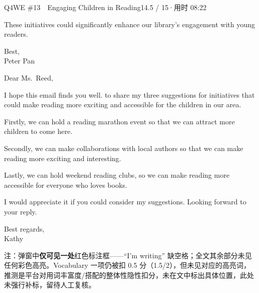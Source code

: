 \begin{qblock}{Q4\quad WE \#13\ \ Engaging Children in Reading}{14.5 / 15\quad·\quad 用时 08:22}
\begin{modelbox}
These initiatives could significantly enhance our library's engagement with young readers.

Best,\\ Peter Pan
\end{modelbox}

\begin{youbox}
Dear Ms.\ Reed,

I hope this email finds you well.  to share my three suggestions for initiatives that could make reading more exciting and accessible for the children in our area.

Firstly, we can hold a reading marathon event so that we can attract more children to come here.

Secondly, we can make collaborations with local authors so that we can make reading more exciting and interesting.

Lastly, we can hold weekend reading clubs, so we can make reading more accessible for everyone who loves books.

I would appreciate it if you could consider my suggestions. Looking forward to your reply.

Best regards,\\ Kathy
\end{youbox}
{\footnotesize\color{gray} 注：弹窗中\textbf{仅可见一处}红色标注框——``I'm writing'' 缺空格；全文其余部分未见任何彩色高亮。Vocabulary 一项仍被扣 0.5 分（1.5/2），但未见对应的高亮词，推测是平台对用词丰富度/搭配的整体性隐性扣分，未在文中标出具体位置，此处未强行补标，留待人工复核。}


\end{qblock}
